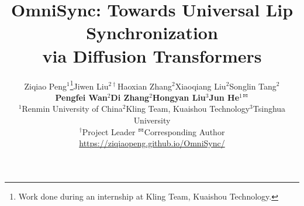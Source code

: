 \documentclass{article}
\title{OmniSync: Towards Universal Lip Synchronization \\ via Diffusion Transformers}
\author{
Ziqiao Peng$^{1}$\thanks{Work done during an internship at Kling Team, Kuaishou Technology.}\quad Jiwen Liu$^{2\dagger}$\quad Haoxian Zhang$^2$\quad Xiaoqiang Liu$^2$\quad Songlin Tang$^2$\quad \\ \textbf{Pengfei Wan$^2$\quad Di Zhang$^2$\quad Hongyan Liu$^3$\quad Jun He$^{1}$$\textsuperscript{\Letter}$} \\
$^1$Renmin University of China\quad $^2$Kling Team, Kuaishou Technology\quad $^3$Tsinghua University \\
$^\dagger$Project Leader \quad $\textsuperscript{\Letter}$Corresponding Author\vspace{0.2cm}\\
\textcolor{magenta}{\url{https://ziqiaopeng.github.io/OmniSync/}}
\vspace{-2em}
}
\begin{document}
\maketitle








{
    
    
}



\newpage
\appendix

\end{document}
